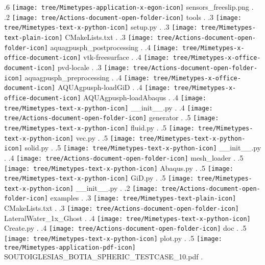 {.6 { \texttt{[image: tree/Mimetypes-application-x-egon-icon]} sensors\_freeslip.png }.
.2 { \texttt{[image: tree/Actions-document-open-folder-icon]} tools }.
.3 { \texttt{[image: tree/Mimetypes-text-x-python-icon]} setup.py }.
.3 { \texttt{[image: tree/Mimetypes-text-plain-icon]} CMakeLists.txt }.
.3 { \texttt{[image: tree/Actions-document-open-folder-icon]} aquagpusph\_postprocessing }.
.4 { \texttt{[image: tree/Mimetypes-x-office-document-icon]} vtk-freesurface }.
.4 { \texttt{[image: tree/Mimetypes-x-office-document-icon]} pvd-locale }.
.3 { \texttt{[image: tree/Actions-document-open-folder-icon]} aquagpusph\_preprocessing }.
.4 { \texttt{[image: tree/Mimetypes-x-office-document-icon]} AQUAgpusph-loadGiD }.
.4 { \texttt{[image: tree/Mimetypes-x-office-document-icon]} AQUAgpusph-loadAbaqus }.
.4 { \texttt{[image: tree/Mimetypes-text-x-python-icon]} \_\_init\_\_.py }.
.4 { \texttt{[image: tree/Actions-document-open-folder-icon]} generator }.
.5 { \texttt{[image: tree/Mimetypes-text-x-python-icon]} fluid.py }.
.5 { \texttt{[image: tree/Mimetypes-text-x-python-icon]} vec.py }.
.5 { \texttt{[image: tree/Mimetypes-text-x-python-icon]} solid.py }.
.5 { \texttt{[image: tree/Mimetypes-text-x-python-icon]} \_\_init\_\_.py }.
.4 { \texttt{[image: tree/Actions-document-open-folder-icon]} mesh\_loader }.
.5 { \texttt{[image: tree/Mimetypes-text-x-python-icon]} Abaqus.py }.
.5 { \texttt{[image: tree/Mimetypes-text-x-python-icon]} GiD.py }.
.5 { \texttt{[image: tree/Mimetypes-text-x-python-icon]} \_\_init\_\_.py }.
.2 { \texttt{[image: tree/Actions-document-open-folder-icon]} examples }.
.3 { \texttt{[image: tree/Mimetypes-text-plain-icon]} CMakeLists.txt }.
.3 { \texttt{[image: tree/Actions-document-open-folder-icon]} LateralWater\_1x\_Ghost }.
.4 { \texttt{[image: tree/Mimetypes-text-x-python-icon]} Create.py }.
.4 { \texttt{[image: tree/Actions-document-open-folder-icon]} doc }.
.5 { \texttt{[image: tree/Mimetypes-text-x-python-icon]} plot.py }.
.5 { \texttt{[image: tree/Mimetypes-application-pdf-icon]} SOUTOIGLESIAS\_BOTIA\_SPHERIC\_TESTCASE\_10.pdf }.
}
